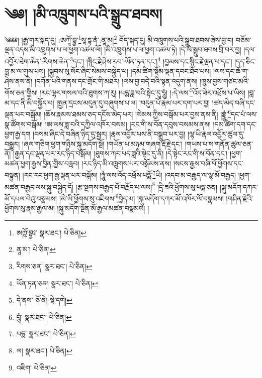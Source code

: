 \setcounter{footnote}{0} 
\chapter{༄༅། །མི་འཁྲུགས་པའི་སྒྲུབ་ཐབས།}༄༅༅། །རྒྱ་གར་སྐད་དུ། :ཨཀཱོ་བྷྱ་\footnote{ཨཀྵོ་བྷྱཿ་  སྣར་ཐང་།  པེ་ཅིན། }སཱ་དྷ་ནཾ་:ནཱ་མ།\footnote{ནཱ་མ་།  པེ་ཅིན། } བོད་སྐད་དུ། མི་འཁྲུགས་པའི་སྒྲུབ་ཐབས་ཞེས་བྱ་བ། བཅོམ་ལྡན་འདས་མི་འཁྲུགས་པ་ལ་ཕྱག་འཚལ་ལོ། །མི་འཁྲུགས་པ་ལ་ཕྱག་འཚལ་ཏེ། །དེ་ཡི་སྒྲུབ་ཐབས་བྲི་བར་བྱ། །དལ་འབྱོར་ཐེག་ཆེན་:རིགས་ཆེན་\footnote{རིགས་ཅན་  སྣར་ཐང་།  པེ་ཅིན། }དང་། །སྙིང་རྗེ་ཤེས་རབ་:ཡོན་ཏན་དང་།\footnote{ཡོན་ཏན་ཅན།  སྣར་ཐང་།  པེ་ཅིན། } །བྱམས་དང་སྙིང་རྗེ་ལྡན་པ་དང་། །དད་ཅིང་བླ་མ་ལ་གུས་པས། །སྐྱབས་སུ་སོང་ཞིང་སེམས་བསྐྱེད་པ། །དམ་ཚིག་སྡོམ་ལྡན་དབང་ཐོབ་པས། །ལས་དང་ཆོ་ག་ཤེས་ནས་ནི། །དགོན་པའི་གནས་དང་གྲོང་གི་མཐར། །ལས་བྱ་བདེ་བའི་སྟན་འདུག་ནས། །ཁྲུས་བྱས་གཙང་མའི་གོས་ཅན་གྱིས། །རང་ལྷར་གསལ་བའི་ཐུགས་ཀ་རུ། །པདྨ་ཟླ་བའི་སྟེང་དུ་ཧཱུཾ། །:དེ་ལས་\footnote{དེ་ནས་  ཅོ་ནེ།  སྡེ་དགེ། }འོད་ཟེར་འཕྲོས་པ་ཡིས། །བླ་མ་དང་ནི་མི་བསྐྱོད་པ། །སྤྱན་དྲངས་མདུན་དུ་བཞུགས་པ་ལ། །བདུན་པོ་རྣམ་པར་དག་པར་བྱ། །ཚད་མེད་བཞི་དང་ལྡན་པར་བསྒོམ། །ཆོས་རྣམས་ཐམས་ཅད་དངོས་མེད་པར། །སེམས་ཀྱིས་བསྒོམ་པར་བྱས་ནས་ནི། །བྷྲཱུཾ་\footnote{བྲུཾ་  སྣར་ཐང་།  པེ་ཅིན། }དང་པཾ་ལས་སྣ་ཚོགས་བསྒོམ། །ཨ་ལས་ཟླ་བའི་དཀྱིལ་འཁོར་བསམ། །རང་གི་ས་བོན་དབུས་བསམས་ནས། །དམ་ཚིག་དག་དང་ཕྱག་རྒྱ་དག །བསམ་ཞིང་དེ་བཞིན་ཉིད་དུ་སྦྱར། །རྣལ་འབྱོར་པས་ནི་བསྒྲུབ་པར་བྱ། །ལྷ་ཡི་རྣལ་འབྱོར་ཚུལ་དུ་བསྒྱུར། །ཞལ་གཅིག་ཕྱག་གཉིས་སྐུ་མདོག་སྔོ། །གཡོན་པ་མཉམ་གཞག་རྡོ་རྗེ་དང་། །གཡས་པ་ས་གནོན་ཚུལ་ཅན་ནོ། །རྒྱན་དང་ལྡན་པར་རང་ཉིད་བསྒོམ། །ཐུགས་ཀར་པད་ཟླའི་སྟེང་དུ་ནི། །དེ་སྟེང་རང་གི་ས་བོན་དང་། །ཕྱག་མཚན་ཕྱག་རྒྱས་བྱིན་གྱིས་བརླབ། །རང་ཉིད་མི་འཁྲུགས་པར་བསྒོམས་ནས། །སངས་རྒྱས་བཞི་པོ་ཕྱོགས་དང་བསྟུན། །རང་རང་ཕྱག་རྒྱ་ལྡན་པར་བསྒོམ། །ཧཱུཾ་ལས་འོད་འཕྲོས་པདྨོ་\footnote{པདྨ་  སྣར་ཐང་།  པེ་ཅིན། }ཡི། །འདབ་མ་བརྒྱད་ལ་ལྷ་མོ་བརྒྱད། །ཕྱག་མཚན་བརྒྱད་ལས་སྐུ་བསྐྱེད་དོ། །རྩ་སྔགས་བརྒྱད་པོ་བརྗོད་པ་ལས།\footnote{ལ།  སྣར་ཐང་།  པེ་ཅིན། } །དྲི་ཟའི་ཕྱོགས་སུ་པདྨ་ཅན། །སྐུ་མདོག་དཀར་མོ་དཔལ་བེའུ་བསྣམས། །མེ་ཡི་ཕྱོགས་སུ་འཇིགས་\footnote{འཇིག་  པེ་ཅིན། }བྱེད་མ། །སྐུ་མདོག་དཀར་མོ་འཁོར་ལོ་བསྣམས། །གཤིན་རྗེའི་ཕྱོགས་སུ་རྣམ་རྒྱལ་མ། །སྐུ་མདོག་སྔོན་མོ་རྒྱལ་མཚན་བསྣམས། །
